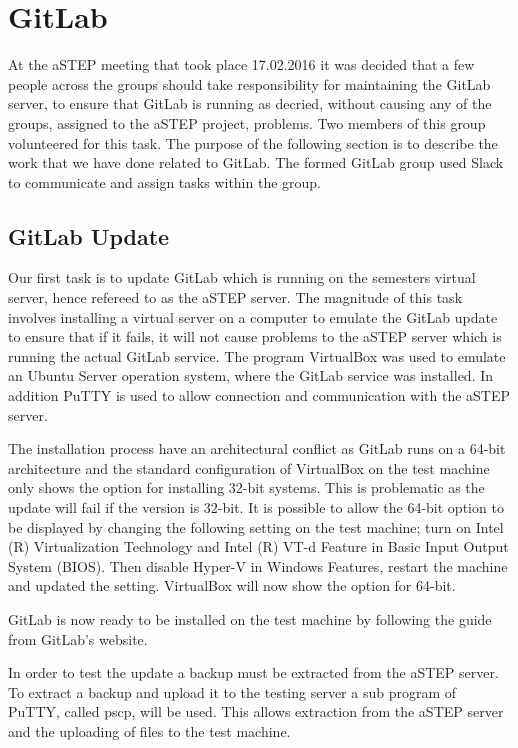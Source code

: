\section{GitLab}
At the aSTEP meeting that took place 17.02.2016 it was decided that a few people across the groups should take responsibility for maintaining the GitLab server, to ensure that GitLab is running as decried, without causing any of the groups, assigned to the aSTEP project, problems. Two members of this group volunteered for this task. The purpose of the following section is to describe the work that we have done related to GitLab. The formed GitLab group used Slack to communicate and assign tasks within the group. 

\subsection{GitLab Update}
Our first task is to update GitLab which is running on the semesters virtual server, hence refereed to as the aSTEP server. The magnitude of this task involves installing a virtual server on a computer to emulate the GitLab update to ensure that if it fails, it will not cause problems to the aSTEP server which is running the actual GitLab service. The program VirtualBox\cite{vbox} was used to emulate an Ubuntu Server operation system, where the GitLab service was installed. In addition PuTTY\cite{putty} is used to allow connection and communication with the aSTEP server.

The installation process have an architectural conflict as GitLab runs on a 64-bit architecture and the standard configuration of VirtualBox on the test machine only shows the option for installing 32-bit systems. This is problematic as the update will fail if the version is 32-bit. It is possible to allow the 64-bit option to be displayed by changing the following setting on the test machine; turn on Intel (R) Virtualization Technology and Intel (R) VT-d Feature in Basic Input Output System (BIOS). Then disable Hyper-V in Windows Features, restart the machine and updated the setting. VirtualBox will now show the option for 64-bit. 

GitLab is now ready to be installed on the test machine by following the guide from GitLab's website\cite{gitlab_guide}.

In order to test the update a backup must be extracted from the aSTEP server. To extract a backup and upload it to the testing server a sub program of PuTTY, called pscp, will be used. This allows extraction from the aSTEP server and the uploading of files to the test machine.

